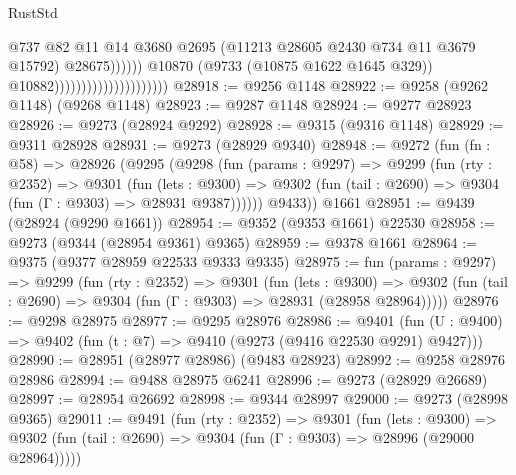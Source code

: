 \begin{lexlean}{RustStd}
\begin{coremodule}
                                                          @737
                                                          @82
                                                          @11
                                                          @14
                                                          @3680
                                                          @2695
                                                          (@11213
                                                            @28605
                                                            @2430
                                                            @734
                                                            @11
                                                            @3679
                                                            @15792)
                                                          @28675))))))
                                              @10870
                                              (@9733 (@10875 @1622 @1645 @329))
                                              @10882)))))))))))))))))))))
@28918 := @9256 @1148
@28922 := @9258 (@9262 @1148) (@9268 @1148)
@28923 := @9287 @1148
@28924 := @9277 @28923
@28926 := @9273 (@28924 @9292)
@28928 := @9315 (@9316 @1148)
@28929 := @9311 @28928
@28931 := @9273 (@28929 @9340)
@28948 := @9272
    (fun (fn : @58) =>
    @28926
      (@9295
        (@9298
          (fun (params : @9297) =>
          @9299
            (fun (rty : @2352) =>
            @9301
              (fun (lets : @9300) =>
              @9302 (fun (tail : @2690) => @9304 (fun (Γ : @9303) => @28931 @9387))))))
        @9433))
    @1661
@28951 := @9439 (@28924 (@9290 @1661))
@28954 := @9352 (@9353 @1661) @22530
@28958 := @9273 (@9344 (@28954 @9361) @9365)
@28959 := @9378 @1661
@28964 := @9375 (@9377 @28959 @22533 @9333 @9335)
@28975 := fun (params : @9297) =>
  @9299
    (fun (rty : @2352) =>
    @9301
      (fun (lets : @9300) =>
      @9302 (fun (tail : @2690) => @9304 (fun (Γ : @9303) => @28931 (@28958 @28964)))))
@28976 := @9298 @28975
@28977 := @9295 @28976
@28986 := @9401
    (fun (U : @9400) => @9402 (fun (t : @7) => @9410 (@9273 (@9416 @22530 @9291) @9427)))
@28990 := @28951 (@28977 @28986) (@9483 @28923)
@28992 := @9258 @28976 @28986
@28994 := @9488 @28975 @6241
@28996 := @9273 (@28929 @26689)
@28997 := @28954 @26692
@28998 := @9344 @28997
@29000 := @9273 (@28998 @9365)
@29011 := @9491
    (fun (rty : @2352) =>
    @9301
      (fun (lets : @9300) =>
      @9302 (fun (tail : @2690) => @9304 (fun (Γ : @9303) => @28996 (@29000 @28964)))))

\end{coremodule}
\end{lexlean}
